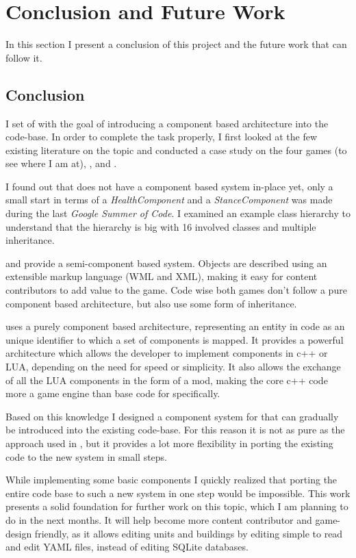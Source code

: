 \section{Conclusion and Future Work}
In this section I present a conclusion of this project and the future work that can follow it.

\subsection{Conclusion}
I set of with the goal of introducing a component based architecture into the \UH{} code-base. In order to complete the
task properly, I first looked at the few existing literature on the topic and conducted a case study on the four \OS{}
games \UH{} (to see where I am at), \BOW{}, \GLEST{} and \AD{}.

I found out that \UH{} does not have a component based system in-place yet, only a small start in terms of a
\textit{HealthComponent} and a \textit{StanceComponent} was made during the last \textit{Google Summer of Code}. I
examined an example class hierarchy to understand that the hierarchy is big with 16 involved classes and multiple
inheritance.

\BOW{} and \GLEST{} provide a semi-component based system. Objects are described using an extensible markup language
(WML and XML), making it easy for content contributors to add value to the game. Code wise both games don't follow a
pure component based architecture, but also use some form of inheritance.

\AD{} uses a purely component based architecture, representing an entity in code as an unique identifier to which a set
of components is mapped. It provides a powerful architecture which allows the developer to implement components in c++
or LUA, depending on the need for speed or simplicity. It also allows the exchange of all the LUA components in the form
of a mod, making the core c++ code more a game engine than base code for \AD{} specifically.

Based on this knowledge I designed a component system for \UH{} that can gradually be introduced into the existing
code-base. For this reason it is not as pure as the approach used in \AD{}, but it provides a lot more flexibility in
porting the existing code to the new system in small steps.

While implementing some basic components I quickly realized that porting the entire code base to such a new system in
one step would
be impossible. This work presents a solid foundation for further work on this topic, which I am planning to do in the
next months. It will help \UH{} become more content contributor and game-design friendly, as it allows editing units and
buildings by editing simple to read and edit YAML files, instead of editing SQLite databases.


